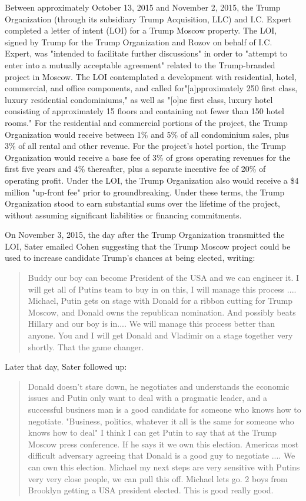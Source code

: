 Between approximately October 13, 2015 and November 2, 2015, the Trump Organization (through its subsidiary Trump Acquisition, LLC) and I.C. Expert completed a letter of intent (LOI) for a Trump Moscow property.
The LOI, signed by Trump for the Trump Organization and Rozov on behalf of I.C. Expert, was "intended to facilitate further discussions" in order to "attempt to enter into a  mutually acceptable agreement" related to the Trump-branded project in Moscow.
The LOI contemplated a development with residential, hotel, commercial, and office components, and called for"[a]pproximately 250 first class, luxury residential condominiums," as well as "[o]ne first class, luxury hotel consisting of approximately 15 floors and containing not fewer than 150 hotel rooms."
For the residential and commercial portions of the project, the Trump Organization would receive between 1\% and 5\% of all condominium sales, plus 3\% of all rental and other revenue.
For the project's hotel portion, the Trump Organization would receive a base fee of 3\% of gross operating revenues for the first five years and 4\% thereafter, plus a  separate incentive fee of 20\% of operating profit.
Under the LOI, the Trump Organization also would receive a \$4 million "up-front fee" prior to groundbreaking.
Under these terms, the Trump Organization stood to earn substantial sums over the lifetime of the project, without assuming significant liabilities or financing commitments.

On November 3, 2015, the day after the Trump Organization transmitted the LOI, Sater emailed Cohen suggesting that the Trump Moscow project could be used to increase candidate Trump's chances at being elected, writing:

\begin{quote}
Buddy our boy can become President of the USA and we can engineer it.
I will get all of Putins team to buy in on this, I will manage this process ....
Michael, Putin gets on stage with Donald for a ribbon cutting for Trump Moscow, and Donald owns the republican nomination.
And possibly beats Hillary and our boy is in....
We will manage this process better than anyone.
You and I will get Donald and Vladimir on a stage together very shortly.
That the game changer.
\end{quote}

Later that day, Sater followed up:

\begin{quote}
Donald doesn't stare down, he negotiates and understands the economic issues and Putin only want to deal with a pragmatic leader, and a successful business man is a good candidate for someone who knows how to negotiate.
"Business, politics, whatever it all is the same for someone who knows how to deal"
I think I can get Putin to say that at the Trump Moscow press conference.
If he says it we own this election.
Americas most difficult adversary agreeing that Donald is a good guy to negotiate ....
We can own this election.
Michael my next steps are very sensitive with Putins very very close people, we can pull this off.
Michael lets go.
2 boys from Brooklyn getting a USA president elected.
This is good really good.
\end{quote}

